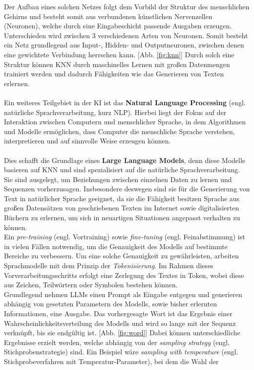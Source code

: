 Der Aufbau eines solchen Netzes folgt dem Vorbild der Struktur des menschlichen Gehirns und besteht somit aus verbundenen künstlichen Nervenzellen (Neuronen), welche durch eine Eingabeschicht passende Ausgaben erzeugen. \cite*{morrKuenstlicheNeuronaleNetze} Unterschieden wird zwischen 3 verschiedenen Arten von Neuronen. Somit besteht ein Netz grundlegend aus Input-, Hidden- und Outputneuronen, zwischen denen eine gewichtete Verbindung herrschen kann. \cite*{NeuronaleNetzeEinfuhrung} [Abb. \ref{fig:knn}] Durch solch eine Struktur können KNN durch maschinelles Lernen mit großen Datenmengen trainiert werden und dadurch Fähigkeiten wie das Generieren von Texten erlernen. \cite*{seemannKuenstlicheIntelligenzLarge}\\\\ Ein weiteres Teilgebiet in der KI ist das \textbf{Natural Language Processing} (engl. natürliche Sprachverarbeitung, kurz NLP). Hierbei liegt der Fokus auf der Interaktion zwischen Computern und menschlicher Sprache, in dem Algorithmen und Modelle ermöglichen, dass Computer die menschliche Sprache verstehen, interpretieren und auf sinnvolle Weise erzeugen können. \cite*{muruganNaturalLanguageProcessing2024} \\\\ Dies schafft die Grundlage eines \textbf{Large Language Models}, denn diese Modelle basieren auf KNN und sind spezialisiert auf die natürliche Sprachverarbeitung. \cite*{seemannKuenstlicheIntelligenzLarge} Sie sind ausgelegt, um Beziehungen zwischen einzelnen Daten zu lernen und Sequenzen vorherzusagen. Insbesondere deswegen sind sie für die Generierung von Text in natürlicher Sprache geeignet, da sie die Fähigkeit besitzen Sprache aus großen Datensätzen von geschriebenen Texten im Internet sowie digitalisierten Büchern zu erlernen, um sich in neuartigen Situationen angepasst verhalten zu können. \cite*{okerlundWhatChatterbox2022} \cite*{authorityofthehouseoflordsLargeLanguageModels} \\Ein \textit{pre-training} (engl. Vortraining) sowie \textit{fine-tuning} (engl. Feinabstimmung) ist in vielen Fällen notwendig, um die Genauigkeit des Modells auf bestimmte Bereiche zu verbessern. \cite{HowLLMsWork} Um eine solche Genauigkeit zu gewährleisten, arbeiten Sprachmodelle mit dem Prinzip der \textit{Tokenisierung}. Im Rahmen dieses Vorverarbeitungsschritts erfolgt eine Zerlegung des Textes in Token, wobei diese aus Zeichen, Teilwörtern oder Symbolen bestehen können. \cite*{naveedComprehensiveOverviewLarge2024} \\ Grundlegend nehmen LLMs einen Prompt als Eingabe entgegen und generieren abhängig von gesetzten Parametern des Modells, sowie bisher erlernten Informationen, eine Ausgabe. Das vorhergesagte Wort ist das Ergebnis einer Wahrscheinlichkeitsverteilung des Modells und wird so lange mit der Sequenz verknüpft, bis sie endgültig ist. [Abb. \ref{fig:word}] Dabei können unterschiedliche Ergebnisse erzielt werden, welche abhängig von der \textit{sampling strategy} (engl. Stichprobenstrategie) sind. \cite*{cholletDeepLearningPython2018} Ein Beispiel wäre \textit{sampling with temperature} (engl. Stichprobeverfahren mit Temperatur-Parameter), bei dem die Wahl der 
